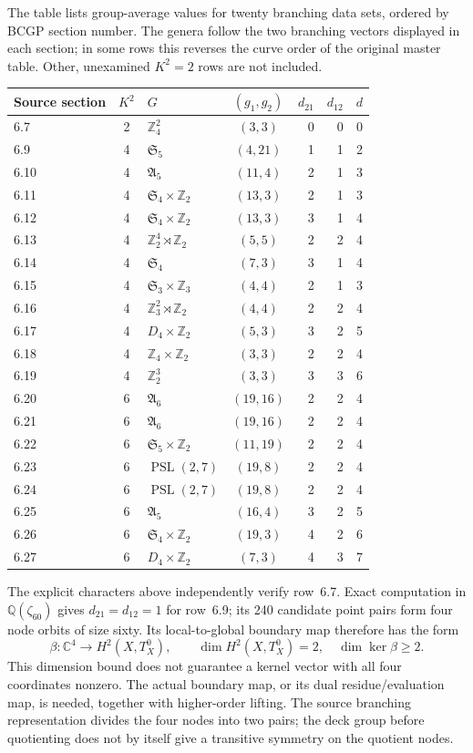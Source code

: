 \documentclass[a4paper,11pt]{article}
\numberwithin{equation}{section}
\theoremstyle{definition}
\newcommand{\Z}{\mathbb Z}
\begin{document}
The table lists group-average values for twenty branching data sets, ordered by BCGP section number. The genera follow the two branching vectors displayed in each section; in some rows this reverses the curve order of the original master table. Other, unexamined $K^2=2$ rows are not included.
\begin{longtable}{@{}lclcrrr@{}}
\toprule Source section & $K^2$ & $G$ & $(g_1,g_2)$ & $d_{21}$ & $d_{12}$ & $d$\\\midrule\endhead
6.7 & 2 & $\Z_4^2$ & $(3,3)$ & 0 & 0 & 0\\
6.9 & 4 & $\mathfrak S_5$ & $(4,21)$ & 1 & 1 & 2\\
6.10 & 4 & $\mathfrak A_5$ & $(11,4)$ & 2 & 1 & 3\\
6.11 & 4 & $\mathfrak S_4\times\Z_2$ & $(13,3)$ & 2 & 1 & 3\\
6.12 & 4 & $\mathfrak S_4\times\Z_2$ & $(13,3)$ & 3 & 1 & 4\\
6.13 & 4 & $\Z_2^4\rtimes\Z_2$ & $(5,5)$ & 2 & 2 & 4\\
6.14 & 4 & $\mathfrak S_4$ & $(7,3)$ & 3 & 1 & 4\\
6.15 & 4 & $\mathfrak S_3\times\Z_3$ & $(4,4)$ & 2 & 1 & 3\\
6.16 & 4 & $\Z_3^2\rtimes\Z_2$ & $(4,4)$ & 2 & 2 & 4\\
6.17 & 4 & $D_4\times\Z_2$ & $(5,3)$ & 3 & 2 & 5\\
6.18 & 4 & $\Z_4\times\Z_2$ & $(3,3)$ & 2 & 2 & 4\\
6.19 & 4 & $\Z_2^3$ & $(3,3)$ & 3 & 3 & 6\\
6.20 & 6 & $\mathfrak A_6$ & $(19,16)$ & 2 & 2 & 4\\
6.21 & 6 & $\mathfrak A_6$ & $(19,16)$ & 2 & 2 & 4\\
6.22 & 6 & $\mathfrak S_5\times\Z_2$ & $(11,19)$ & 2 & 2 & 4\\
6.23 & 6 & $\operatorname{PSL}(2,7)$ & $(19,8)$ & 2 & 2 & 4\\
6.24 & 6 & $\operatorname{PSL}(2,7)$ & $(19,8)$ & 2 & 2 & 4\\
6.25 & 6 & $\mathfrak A_5$ & $(16,4)$ & 3 & 2 & 5\\
6.26 & 6 & $\mathfrak S_4\times\Z_2$ & $(19,3)$ & 4 & 2 & 6\\
6.27 & 6 & $D_4\times\Z_2$ & $(7,3)$ & 4 & 3 & 7\\\bottomrule
\end{longtable}
The explicit characters above independently verify row~6.7. Exact computation in $\mathbb Q(\zeta_{60})$ gives $d_{21}=d_{12}=1$ for row~6.9; its 240 candidate point pairs form four node orbits of size sixty. Its local-to-global boundary map therefore has the form
\[
\beta:\mathbb C^4\longrightarrow H^2(X,T_X^0),\qquad
\dim H^2(X,T_X^0)=2,\quad \dim\ker\beta\ge2.
\]
This dimension bound does not guarantee a kernel vector with all four coordinates nonzero. The actual boundary map, or its dual residue/evaluation map, is needed, together with higher-order lifting. The source branching representation divides the four nodes into two pairs; the deck group before quotienting does not by itself give a transitive symmetry on the quotient nodes.
\end{document}
